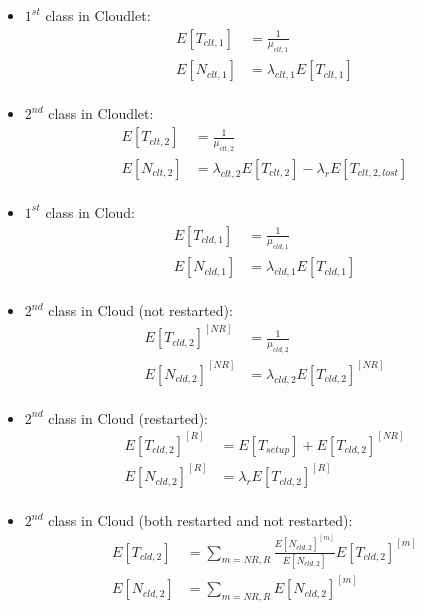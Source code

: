 \begin{itemize}
	\item $1^{st}$ class in Cloudlet:
	\begin{equation} 
	\begin{split}
	E[T_{clt,1}] &= \frac{1}{\mu_{clt,1}} \\
	E[N_{clt,1}] &= \lambda_{clt,1}E[T_{clt,1}] \\
	\end{split}
	\end{equation}

	\item $2^{nd}$ class in Cloudlet:
	\begin{equation} 
	\begin{split}
	E[T_{clt,2}] &= \frac{1}{\mu_{clt,2}} \\
	E[N_{clt,2}] &= \lambda_{clt,2}E[T_{clt,2}]-\lambda_{r} E[T_{clt,2,lost}] \\
	\end{split}
	\end{equation}
	
	\item $1^{st}$ class in Cloud:
	\begin{equation} 
	\begin{split}
	E[T_{cld,1}] &= \frac{1}{\mu_{cld,1}} \\
	E[N_{cld,1}] &= \lambda_{cld,1}E[T_{cld,1}] \\
	\end{split}
	\end{equation}
	
	\item $2^{nd}$ class in Cloud (not restarted):
	\begin{equation} 
	\begin{split}
	E[T_{cld,2}]^{[NR]} &= \frac{1}{\mu_{cld,2}} \\
	E[N_{cld,2}]^{[NR]} &= \lambda_{cld,2}E[T_{cld,2}]^{[NR]} \\
	\end{split}
	\end{equation}
	
	\item $2^{nd}$ class in Cloud (restarted):
	\begin{equation} 
	\begin{split}
	E[T_{cld,2}]^{[R]} &= E[T_{setup}]+ E[T_{cld,2}]^{[NR]} \\
	E[N_{cld,2}]^{[R]} &= \lambda_{r}E[T_{cld,2}]^{[R]} \\
	\end{split}
	\end{equation}
	
	\item $2^{nd}$ class in Cloud (both restarted and not restarted):
	\begin{equation} 
	\begin{split}
	E[T_{cld,2}] &= \sum_{m=NR,R}\frac{E[N_{cld,2}]^{[m]}}{E[N_{cld,2}]}E[T_{cld,2}]^{[m]} \\
	E[N_{cld,2}] &= \sum_{m=NR,R}E[N_{cld,2}]^{[m]} \\
	\end{split}
	\end{equation}
\end{itemize}

